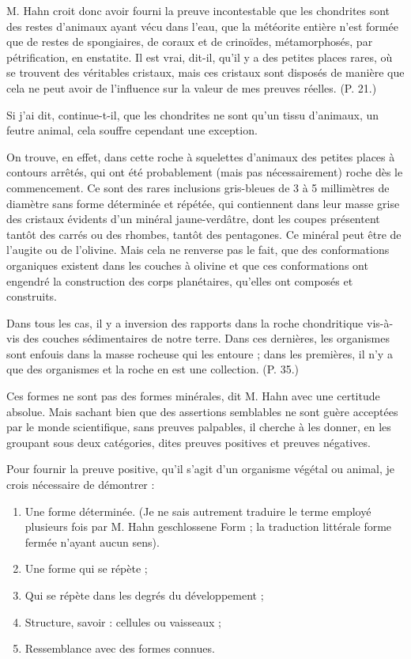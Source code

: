 \documentclass[a4paper, 12pt, oneside, french]{article}
\begin{document}
M. Hahn croit donc avoir fourni \og la preuve incontestable que les chondrites sont des restes d'animaux ayant vécu dans l'eau, que la météorite entière n'est formée que de restes de spongiaires, de coraux et de crinoïdes, métamorphosés, par pétrification, en enstatite. Il est vrai, dit-il, qu'il y a des petites places rares, où se trouvent des véritables cristaux, mais ces cristaux sont disposés de manière que cela ne peut avoir de l'influence sur la valeur de mes preuves réelles. \fg (P. 21.)

\og Si j'ai dit, continue-t-il, que les chondrites ne sont qu'un tissu d'animaux, un feutre animal, cela souffre cependant une exception. \fg

\og On trouve, en effet, dans cette roche à squelettes d'animaux des petites places à contours arrêtés, qui ont été probablement (mais pas nécessairement) roche dès le commencement. Ce sont des rares inclusions gris-bleues de 3 à 5 millimètres de diamètre sans forme déterminée et répétée, qui contiennent dans leur masse grise des cristaux évidents d'un minéral jaune-verdâtre, dont les coupes présentent tantôt des carrés ou des rhombes, tantôt des pentagones. Ce minéral peut être de l'augite ou de l'olivine. Mais cela ne renverse pas le fait, que des conformations organiques existent dans les couches à olivine et que ces conformations ont engendré la construction des corps planétaires, qu'elles ont composés et construits. \fg

\og Dans tous les cas, il y a inversion des rapports dans la roche chondritique vis-à-vis des couches sédimentaires de notre terre. Dans ces dernières, les organismes sont enfouis dans la masse rocheuse qui les entoure ; dans les premières, il n'y a que des organismes et la roche en est une collection. \fg (P. 35.)

\og Ces formes ne sont pas des formes minérales, \fg dit M. Hahn avec une certitude absolue. Mais sachant bien que des assertions semblables ne sont guère acceptées par le monde scientifique, sans preuves palpables, il cherche à les donner, en les groupant sous deux catégories, dites preuves positives et preuves négatives.

\og Pour fournir la preuve positive, qu'il s'agit d'un organisme végétal ou animal, je crois nécessaire de démontrer :
\begin{enumerate}
\item \og Une forme déterminée. \fg (Je ne sais autrement traduire le terme employé plusieurs fois par M. Hahn \og geschlossene Form \fg ; la traduction littérale \og forme fermée \fg n'ayant aucun sens).
\item \og Une forme qui se répète ;
\item \og Qui se répète dans les degrés du développement ;
\item \og Structure, savoir : cellules ou vaisseaux ;
\item \og Ressemblance avec des formes connues.
\end{enumerate}
\end{document}
